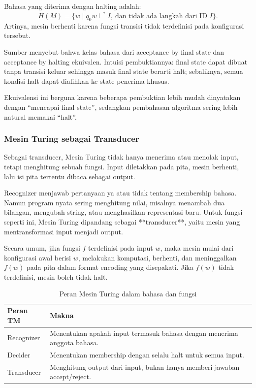 Bahasa yang diterima dengan halting adalah:
\[
    H(M)=\{w\mid q_0w\vdash^* I,\ \text{dan tidak ada langkah dari ID } I\}.
\]
Artinya, mesin berhenti karena fungsi transisi tidak terdefinisi pada konfigurasi tersebut.

Sumber menyebut bahwa kelas bahasa dari acceptance by final state dan acceptance by halting ekuivalen. Intuisi pembuktiannya: final state dapat dibuat tanpa transisi keluar sehingga masuk final state berarti halt; sebaliknya, semua kondisi halt dapat dialihkan ke state penerima khusus.

Ekuivalensi ini berguna karena beberapa pembuktian lebih mudah dinyatakan dengan ``mencapai final state'', sedangkan pembahasan algoritma sering lebih natural memakai ``halt''.

\subsubsection{Mesin Turing sebagai Transducer}

\begin{jawab}
Sebagai transducer, Mesin Turing tidak hanya menerima atau menolak input, tetapi menghitung sebuah fungsi. Input diletakkan pada pita, mesin berhenti, lalu isi pita tertentu dibaca sebagai output.
\end{jawab}

Recognizer menjawab pertanyaan ya atau tidak tentang membership bahasa. Namun program nyata sering menghitung nilai, misalnya menambah dua bilangan, mengubah string, atau menghasilkan representasi baru. Untuk fungsi seperti ini, Mesin Turing dipandang sebagai **transducer**, yaitu mesin yang mentransformasi input menjadi output.

Secara umum, jika fungsi $f$ terdefinisi pada input $w$, maka mesin mulai dari konfigurasi awal berisi $w$, melakukan komputasi, berhenti, dan meninggalkan $f(w)$ pada pita dalam format encoding yang disepakati. Jika $f(w)$ tidak terdefinisi, mesin boleh tidak halt.

\begin{table}[H]
\centering
\begin{tabularx}{\textwidth}{|L{0.24\textwidth}|X|}
\hline
\textbf{Peran TM} & \textbf{Makna} \\
\hline
Recognizer & Menentukan apakah input termasuk bahasa dengan menerima anggota bahasa. \\
\hline
Decider & Menentukan membership dengan selalu halt untuk semua input. \\
\hline
Transducer & Menghitung output dari input, bukan hanya memberi jawaban accept/reject. \\
\hline
\end{tabularx}
\caption{Peran Mesin Turing dalam bahasa dan fungsi}
\label{tab:peran-tm}
\end{table}

